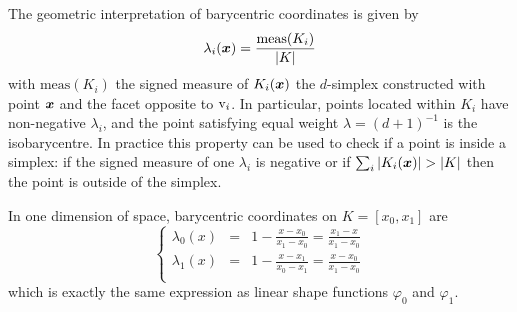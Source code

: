 The geometric interpretation of barycentric coordinates is given by
\[
\displaystyle\lambda_i({{\boldsymbol x}}) = \frac{\mathrm{meas}(K_i)}{|K|}
\]
with $\mathrm{meas}(K_i)$ the signed measure of $K_i({{\boldsymbol x}})$ the $d$-simplex constructed with point ${{\boldsymbol x}}$ and the facet opposite to ${\mathrm v}_i$.
In particular, points located within $K_i$ have non-negative $\lambda_i$, and the point satisfying equal weight $\lambda = (d+1)^{-1}$ is the isobarycentre.
In practice this property can be used to check if a point is inside a simplex: if the signed measure of one $\lambda_i$ is negative or if $\sum_i |K_i({{\boldsymbol x}})| > |K|$ then the point is outside of the simplex.

\begin{xmpl}
In one dimension of space, barycentric coordinates on $K = [x_0, x_1]$ are
\begin{equation*}
\left\lbrace
\begin{array}{lcl}
\lambda_0(x) &=& 1 - \displaystyle\frac{x - x_0}{x_1 - x_0} = \frac{x_1 - x}{x_1 - x_0}\\[2ex]
\lambda_1(x) &=& 1 - \displaystyle\frac{x - x_1}{x_0 - x_1} = \frac{x - x_0}{x_1 - x_0}\\
\end{array}
\right.
\end{equation*}
which is exactly the same expression as linear shape functions $\varphi_0$ and $\varphi_1$.
\end{xmpl}


